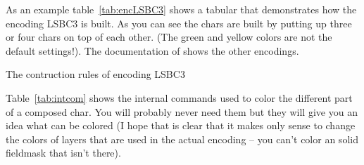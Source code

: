 \documentclass[pagesize,parskip=half-,fontsize=12pt]{scrartcl}
\begin{document}
As an example table~\ref{tab:encLSBC3} shows a tabular that
demonstrates how the encoding LSBC3 is built. As you can see the
chars are built by putting up three or four chars on top of each
other. (The green and yellow colors are not the default settings!).
The documentation of
\chessfss shows the other encodings.



\begin{table}
%

\caption{The contruction rules of encoding LSBC3}\label{tab:encLSBC3}

{}


\end{table}

Table~\ref{tab:intcom} shows the internal commands used to color the
different part of a composed char. You will probably never need them
but they will give you an idea what can be colored (I hope that is
clear that it makes only sense to change the colors of layers that
are used in the actual encoding -- you can't color an solid fieldmask
that isn't there).
\end{document}
